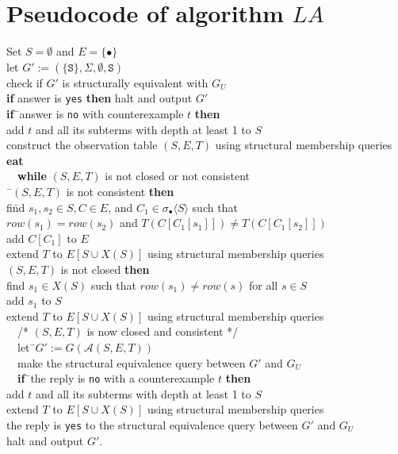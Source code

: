 \documentclass[preprint,12pt,english]{article}
\def\hole{\bullet}
\def\tS{\mathtt{S}}
\def\cA{\mathcal{A}}
\newcommand\pair[1]{\langle{#1}\rangle}
\begin{document}
\section{Pseudocode of algorithm $LA$}
\label{LA}
\begin{tabbing}
Set $S=\emptyset$ and $E=\{\bullet\}$\\
let $G':=(\{\tS\},\Sigma,\emptyset,\tS)$\\
check if $G'$ is structurally equivalent with $G_U$\\
{\bf if} answer is {\tt yes} {\bf then} halt and output $G'$\\
{\bf if}\=\ answer is {\tt no} with counterexample $t$ {\bf then}\\
\>add $t$ and all its subterms with depth at least 1 to $S$\\
\>construct the observation table $(S,E,T)$ using structural membership queries\\
\={\bf{eat}}\\
\>\ \ {\bf while} $(S,E,T)$ is not closed or not consistent\\
\>\=\ $(S,E,T)$ is not consistent {\bf then}\\
\>\>\>fi\=nd $s_1,s_2\in S,C\in E$, and $C_1\in\sigma_\hole\pair{S}$ such that\\
\>\>\>\>$row(s_1)=row(s_2)$ and $T(C[C_1[s_1]])\neq T(C[C_1[s_2]])$\\
\>\>\>add $C[C_1]$ to $E$\\
\>\>\>extend $T$ to $E[S\cup X(S)]$ using structural membership queries\\
\> $(S,E,T)$ is not closed {\bf then}\\
\>\>\>find $s_1\in X(S)$ such that $row(s_1)\neq row(s)$ for all $s\in S$\\
\>\>\>add $s_1$ to $S$\\
\>\>\>extend $T$ to $E[S\cup X(S)]$ using structural membership queries\\
\>\ \ /* $(S,E,T)$ is now closed and consistent */ \\
\>\ \ let\=\ $G':=G(\cA(S,E,T))$\\
\>\ \ make the structural equivalence query between $G'$ and $G_U$\\
\>\ \ {\bf if}\=\ the reply is {\tt no} with a counterexample $t$ {\bf then}\\
\>\>add $t$ and all its subterms with depth at least 1 to $S$\\
\>\>extend $T$ to $E[S\cup X(S)]$ using structural membership queries\\
 the reply is {\tt yes} to the structural equivalence query between $G'$ and $G_U$\\
\>halt and output $G'$.
\end{tabbing}
\end{document}
